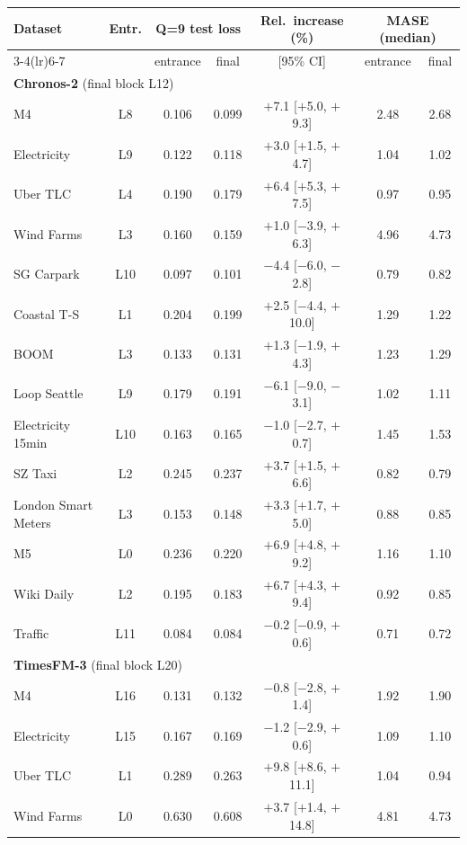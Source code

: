 \begin{tabular}{l c cc c cc}
\toprule
Dataset & Entr. & \multicolumn{2}{c}{Q=9 test loss} & Rel.\ increase (\%) & \multicolumn{2}{c}{MASE (median)} \\
\cmidrule(lr){3-4}\cmidrule(lr){6-7}
 & & entrance & final & [95\% CI] & entrance & final \\
\midrule
\multicolumn{7}{l}{\textbf{Chronos-2} (final block L12)} \\
M4 & L8 & 0.106 & 0.099 & $+$7.1 [$+$5.0, $+$9.3] & 2.48 & 2.68 \\
Electricity & L9 & 0.122 & 0.118 & $+$3.0 [$+$1.5, $+$4.7] & 1.04 & 1.02 \\
Uber TLC & L4 & 0.190 & 0.179 & $+$6.4 [$+$5.3, $+$7.5] & 0.97 & 0.95 \\
Wind Farms & L3 & 0.160 & 0.159 & $+$1.0 [$-$3.9, $+$6.3] & 4.96 & 4.73 \\
SG Carpark & L10 & 0.097 & 0.101 & $-$4.4 [$-$6.0, $-$2.8] & 0.79 & 0.82 \\
Coastal T-S & L1 & 0.204 & 0.199 & $+$2.5 [$-$4.4, $+$10.0] & 1.29 & 1.22 \\
BOOM & L3 & 0.133 & 0.131 & $+$1.3 [$-$1.9, $+$4.3] & 1.23 & 1.29 \\
Loop Seattle & L9 & 0.179 & 0.191 & $-$6.1 [$-$9.0, $-$3.1] & 1.02 & 1.11 \\
Electricity 15min & L10 & 0.163 & 0.165 & $-$1.0 [$-$2.7, $+$0.7] & 1.45 & 1.53 \\
SZ Taxi & L2 & 0.245 & 0.237 & $+$3.7 [$+$1.5, $+$6.6] & 0.82 & 0.79 \\
London Smart Meters & L3 & 0.153 & 0.148 & $+$3.3 [$+$1.7, $+$5.0] & 0.88 & 0.85 \\
M5 & L0 & 0.236 & 0.220 & $+$6.9 [$+$4.8, $+$9.2] & 1.16 & 1.10 \\
Wiki Daily & L2 & 0.195 & 0.183 & $+$6.7 [$+$4.3, $+$9.4] & 0.92 & 0.85 \\
Traffic & L11 & 0.084 & 0.084 & $-$0.2 [$-$0.9, $+$0.6] & 0.71 & 0.72 \\
\midrule
\multicolumn{7}{l}{\textbf{TimesFM-3} (final block L20)} \\
M4 & L16 & 0.131 & 0.132 & $-$0.8 [$-$2.8, $+$1.4] & 1.92 & 1.90 \\
Electricity & L15 & 0.167 & 0.169 & $-$1.2 [$-$2.9, $+$0.6] & 1.09 & 1.10 \\
Uber TLC & L1 & 0.289 & 0.263 & $+$9.8 [$+$8.6, $+$11.1] & 1.04 & 0.94 \\
Wind Farms & L0 & 0.630 & 0.608 & $+$3.7 [$+$1.4, $+$14.8] & 4.81 & 4.73 \\

\end{tabular}
